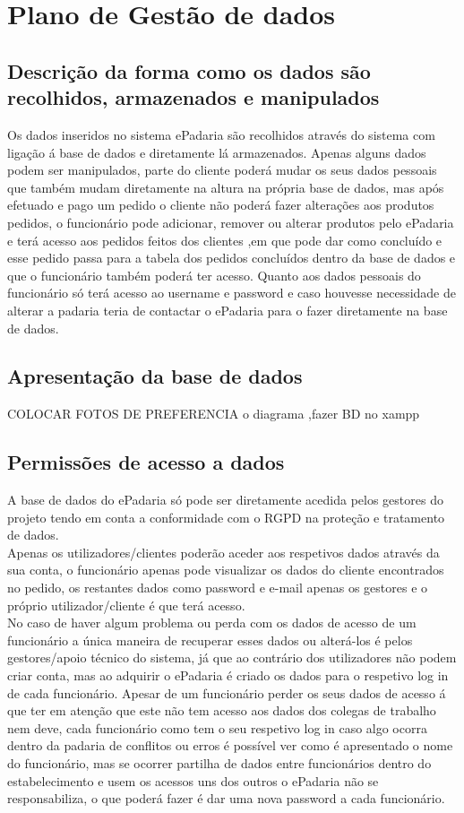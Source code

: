 \chapter{Plano de Gestão de dados}
\label{plano_de_gestao_de_dados}
\section{Descrição da forma como os dados são recolhidos, armazenados e manipulados}
Os dados inseridos no sistema ePadaria são recolhidos através do sistema com ligação á base de dados e diretamente lá armazenados. Apenas alguns dados podem ser manipulados, parte do cliente poderá mudar os seus dados pessoais que também mudam diretamente na altura na própria base de dados, mas após efetuado e pago um pedido o cliente não poderá fazer alterações aos produtos pedidos, o funcionário pode adicionar, remover ou alterar produtos pelo ePadaria e terá acesso aos pedidos feitos dos clientes ,em que pode dar como concluído e esse pedido passa para a tabela dos pedidos concluídos dentro da base de dados e que o funcionário também poderá ter acesso. Quanto aos dados pessoais do funcionário só terá acesso ao username e password e caso houvesse necessidade de alterar a padaria teria de contactar o ePadaria para o fazer diretamente na base de dados.
\section{Apresentação da base de dados}
COLOCAR FOTOS DE PREFERENCIA o diagrama ,fazer BD no xampp
\section{Permissões de acesso a dados}
A base de dados do ePadaria só pode ser diretamente acedida pelos gestores do projeto tendo em conta a conformidade com o RGPD na proteção e tratamento de dados.\\
Apenas os utilizadores/clientes poderão aceder aos respetivos dados através da sua conta, o funcionário apenas pode visualizar os dados do cliente encontrados no pedido, os restantes dados como password e e-mail apenas os gestores e o próprio utilizador/cliente é que terá acesso.\\
No caso de haver algum problema ou perda com os dados de acesso de um funcionário a única maneira de recuperar esses dados ou alterá-los é pelos gestores/apoio técnico do sistema, já que ao contrário dos utilizadores não podem criar conta, mas ao adquirir o ePadaria é criado os dados para o respetivo log in de cada funcionário. Apesar de um funcionário perder os seus dados de acesso á que ter em atenção que este não tem acesso aos dados dos colegas de trabalho nem deve, cada funcionário como tem o seu respetivo log in caso algo ocorra dentro da padaria de conflitos ou erros é possível ver como é apresentado o nome do funcionário, mas se ocorrer partilha de dados entre funcionários dentro do estabelecimento e usem os acessos uns dos outros o ePadaria não se responsabiliza, o que poderá fazer é dar uma nova password a cada funcionário.

